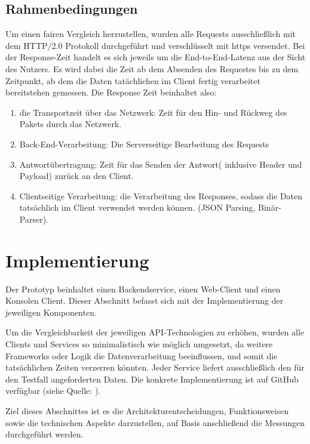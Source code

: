 \subsection*{Rahmenbedingungen}
Um einen fairen Vergleich herzustellen, wurden alle Requests ausschließlich mit dem HTTP/2.0 Protokoll durchgeführt und verschlüsselt mit https versendet. Bei der Response-Zeit handelt es sich jeweils um die End-to-End-Latenz aus der Sicht des Nutzers. Es wird dabei die Zeit ab dem Absenden des Requestes bis zu dem Zeitpunkt, ab dem die Daten tatächlichen im Client fertig verarbeitet bereitstehen gemessen. Die Response Zeit beinhaltet also: 

\begin{enumerate}
	\item die Transportzeit über das Netzwerk:
	Zeit für den Hin- und Rückweg des Pakets durch das Netzwerk.
	
	\item Back-End-Verarbeitung:
	Die Serverseitige Bearbeitung des Requests
	
	\item Antwortübertragung:
	Zeit für das Senden der Antwort( inklusive Header und Payload) zurück an den Client.
	
	\item Clientseitige Verarbeitung:
	die Verarbeitung des Responses, sodass die Daten tatsächlich im Client verwendet werden können. (JSON Parsing, Binär-Parser).
	
\end{enumerate}

\clearpage
\section{Implementierung}
Der Prototyp beinhaltet einen Backendservice, einen Web-Client und einen Konsolen Client. Dieser Abschnitt befasst sich mit der Implementierung der jeweiligen Komponenten. 

Um die Vergleichbarkeit der jeweiligen API-Technologien zu erhöhen, wurden alle Clients und Services so minimalistisch wie möglich umgesetzt, da weitere Frameworks oder Logik die Datenverarbeitung beeinflussen, und somit die tatsächlichen Zeiten verzerren könnten.
Jeder Service liefert ausschließlich den für den Testfall angeforderten Daten. 
Die konkrete Implementierung ist auf GitHub verfügbar (siehe Quelle: \cite{muehlberger2025}).


Ziel dieses Abschnittes ist es die Architekturentscheidungen, Funktionsweisen sowie die technischen Aspekte darzustellen, auf Basis anschließend die Messungen durchgeführt werden.

